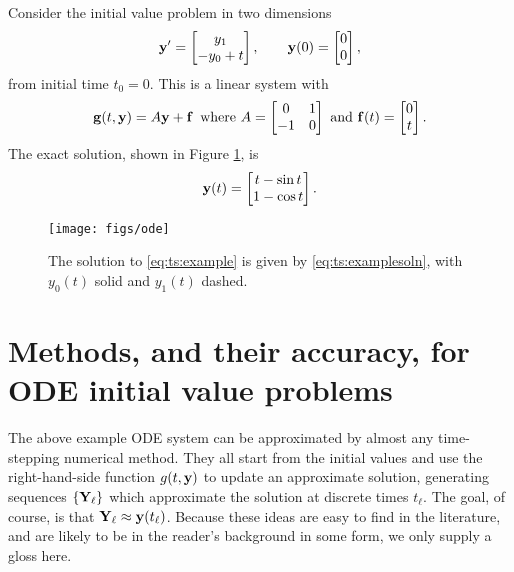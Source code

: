 \noindent\hrulefill
\begin{example}  \label{ex:ts:odeeasy} Consider the initial value problem in two dimensions
\begin{equation}
   \mathbf{y}' = \begin{bmatrix} y_1 \\ - y_0 + t\end{bmatrix}, \qquad \mathbf{y}(0) = \begin{bmatrix} 0 \\ 0 \end{bmatrix}, \label{eq:ts:example}
\end{equation}
from initial time $t_0=0$.  This is a linear system with
    $$\mathbf{g}(t,\mathbf{y}) = A \mathbf{y} + \mathbf{f} \,\text{ where } A = \begin{bmatrix} 0 & 1 \\ -1 & 0 \end{bmatrix} \text{ and } \mathbf{f}(t) = \begin{bmatrix} 0 \\ t\end{bmatrix}.$$
The exact solution, shown in Figure \ref{fig:ts:ode}, is
\begin{equation}
    \mathbf{y}(t) = \begin{bmatrix} t - \sin t \\ 1 - \cos t \end{bmatrix}.\label{eq:ts:examplesoln}
\end{equation}

\vspace{-3mm}
\begin{figure}
\texttt{[image: figs/ode]}
\caption{The solution to \eqref{eq:ts:example} is given by \eqref{eq:ts:examplesoln}, with $y_0(t)$ solid and $y_1(t)$ dashed.}
\label{fig:ts:ode}
\end{figure}
\end{example}
\vspace{-5mm}
\noindent\hrulefill


\section{Methods, and their accuracy, for ODE initial value problems}

The above example ODE system can be approximated by almost any time-stepping numerical method.  They all start from the initial values and use the right-hand-side function $g(t,\mathbf{y})$ to update an approximate solution, generating sequences $\{\mathbf{Y}_\ell\}$ which approximate the solution at discrete times $t_\ell$.  The goal, of course, is that $\mathbf{Y}_\ell \approx \mathbf{y}(t_\ell)$.  Because these ideas are easy to find in the literature, and are likely to be in the reader's background in some form, we only supply a gloss here.

